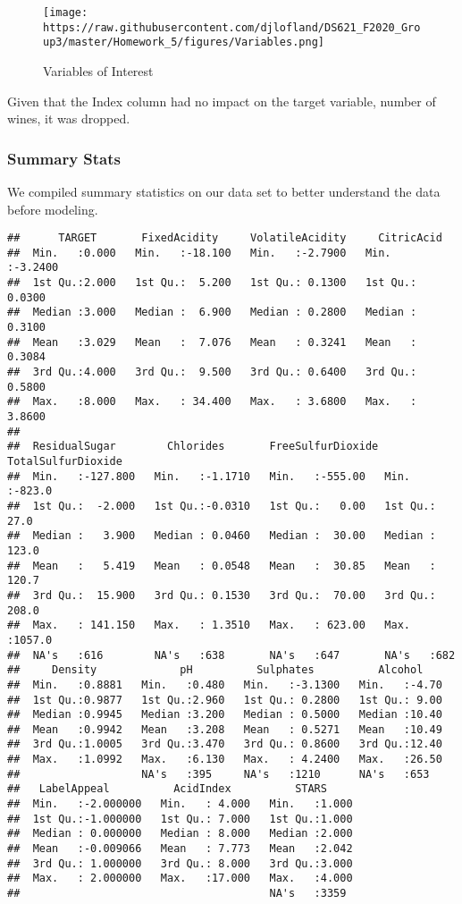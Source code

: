 \documentclass[
]{article}
\begin{document}
\begin{figure}
\centering
\texttt{[image: https://raw.githubusercontent.com/djlofland/DS621\_F2020\_Group3/master/Homework\_5/figures/Variables.png]}
\caption{Variables of Interest}
\end{figure}

Given that the Index column had no impact on the target variable, number
of wines, it was dropped.

\hypertarget{summary-stats}{%
\subsubsection{Summary Stats}\label{summary-stats}}

We compiled summary statistics on our data set to better understand the
data before modeling.

\begin{verbatim}
##      TARGET       FixedAcidity     VolatileAcidity     CitricAcid     
##  Min.   :0.000   Min.   :-18.100   Min.   :-2.7900   Min.   :-3.2400  
##  1st Qu.:2.000   1st Qu.:  5.200   1st Qu.: 0.1300   1st Qu.: 0.0300  
##  Median :3.000   Median :  6.900   Median : 0.2800   Median : 0.3100  
##  Mean   :3.029   Mean   :  7.076   Mean   : 0.3241   Mean   : 0.3084  
##  3rd Qu.:4.000   3rd Qu.:  9.500   3rd Qu.: 0.6400   3rd Qu.: 0.5800  
##  Max.   :8.000   Max.   : 34.400   Max.   : 3.6800   Max.   : 3.8600  
##                                                                       
##  ResidualSugar        Chlorides       FreeSulfurDioxide TotalSulfurDioxide
##  Min.   :-127.800   Min.   :-1.1710   Min.   :-555.00   Min.   :-823.0    
##  1st Qu.:  -2.000   1st Qu.:-0.0310   1st Qu.:   0.00   1st Qu.:  27.0    
##  Median :   3.900   Median : 0.0460   Median :  30.00   Median : 123.0    
##  Mean   :   5.419   Mean   : 0.0548   Mean   :  30.85   Mean   : 120.7    
##  3rd Qu.:  15.900   3rd Qu.: 0.1530   3rd Qu.:  70.00   3rd Qu.: 208.0    
##  Max.   : 141.150   Max.   : 1.3510   Max.   : 623.00   Max.   :1057.0    
##  NA's   :616        NA's   :638       NA's   :647       NA's   :682       
##     Density             pH          Sulphates          Alcohol     
##  Min.   :0.8881   Min.   :0.480   Min.   :-3.1300   Min.   :-4.70  
##  1st Qu.:0.9877   1st Qu.:2.960   1st Qu.: 0.2800   1st Qu.: 9.00  
##  Median :0.9945   Median :3.200   Median : 0.5000   Median :10.40  
##  Mean   :0.9942   Mean   :3.208   Mean   : 0.5271   Mean   :10.49  
##  3rd Qu.:1.0005   3rd Qu.:3.470   3rd Qu.: 0.8600   3rd Qu.:12.40  
##  Max.   :1.0992   Max.   :6.130   Max.   : 4.2400   Max.   :26.50  
##                   NA's   :395     NA's   :1210      NA's   :653    
##   LabelAppeal          AcidIndex          STARS      
##  Min.   :-2.000000   Min.   : 4.000   Min.   :1.000  
##  1st Qu.:-1.000000   1st Qu.: 7.000   1st Qu.:1.000  
##  Median : 0.000000   Median : 8.000   Median :2.000  
##  Mean   :-0.009066   Mean   : 7.773   Mean   :2.042  
##  3rd Qu.: 1.000000   3rd Qu.: 8.000   3rd Qu.:3.000  
##  Max.   : 2.000000   Max.   :17.000   Max.   :4.000  
##                                       NA's   :3359
\end{verbatim}
\end{document}
